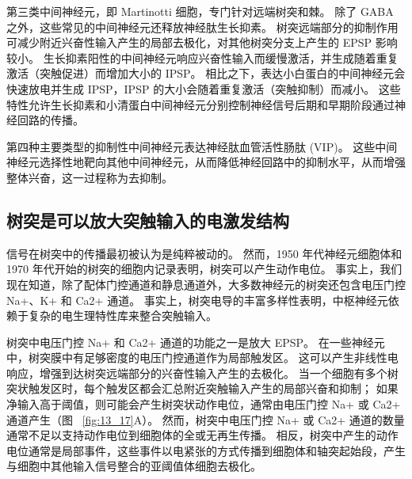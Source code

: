 第三类中间神经元，即 Martinotti 细胞，专门针对远端树突和棘。
除了 GABA 之外，这些常见的中间神经元还释放神经肽生长抑素。
树突远端部分的抑制作用可减少附近兴奋性输入产生的局部去极化，对其他树突分支上产生的 EPSP 影响较小。
生长抑素阳性的中间神经元响应兴奋性输入而缓慢激活，并生成随着重复激活（突触促进）而增加大小的 IPSP。 
相比之下，表达小白蛋白的中间神经元会快速放电并生成 IPSP，IPSP 的大小会随着重复激活（突触抑制）而减小。
这些特性允许生长抑素和小清蛋白中间神经元分别控制神经信号后期和早期阶段通过神经回路的传播。


第四种主要类型的抑制性中间神经元表达神经肽血管活性肠肽 (VIP)。
这些中间神经元选择性地靶向其他中间神经元，从而降低神经回路中的抑制水平，从而增强整体兴奋，这一过程称为去抑制。



\subsection{树突是可以放大突触输入的电激发结构}

信号在树突中的传播最初被认为是纯粹被动的。
然而，1950 年代神经元细胞体和 1970 年代开始的树突的细胞内记录表明，树突可以产生动作电位。
事实上，我们现在知道，除了配体门控通道和静息通道外，大多数神经元的树突还包含电压门控 Na+、K+ 和 Ca2+ 通道。
事实上，树突电导的丰富多样性表明，中枢神经元依赖于复杂的电生理特性库来整合突触输入。


树突中电压门控 Na+ 和 Ca2+ 通道的功能之一是放大 EPSP。
在一些神经元中，树突膜中有足够密度的电压门控通道作为局部触发区。
这可以产生非线性电响应，增强到达树突远端部分的兴奋性输入产生的去极化。
当一个细胞有多个树突状触发区时，每个触发区都会汇总附近突触输入产生的局部兴奋和抑制；
如果净输入高于阈值，则可能会产生树突状动作电位，通常由电压门控 Na+ 或 Ca2+ 通道产生（图 ~\ref{fig:13_17}A）。
然而，树突中电压门控 Na+ 或 Ca2+ 通道的数量通常不足以支持动作电位到细胞体的全或无再生传播。
相反，树突中产生的动作电位通常是局部事件，这些事件以电紧张的方式传播到细胞体和轴突起始段，产生与细胞中其他输入信号整合的亚阈值体细胞去极化。


